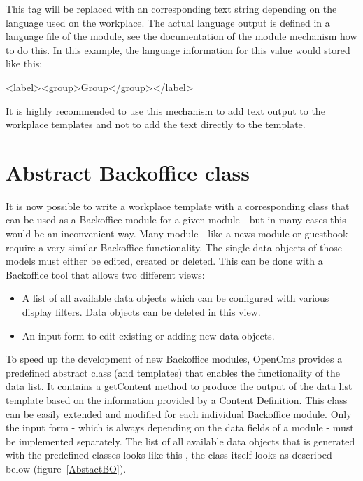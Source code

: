 This tag will be replaced with an corresponding text string depending on
the language used on the workplace. The actual language output is
defined in a language file of the module, see the documentation of the
module mechanism how to do this. In this example, the language
information for this value would stored like this:
\begin{java}
<label><group>Group</group></label>\\
\end{java}
It is highly recommended to use this mechanism to add text output to the
workplace templates and not to add the text directly to the template.

\section {Abstract Backoffice class}
It is now possible to write a workplace template with a corresponding
class that can be used as a Backoffice module for a given module - but
in many cases this would be an inconvenient way. Many module - like a
news module or guestbook -  require a very similar Backoffice
functionality. The single data objects of those models must either be
edited, created or deleted. This can be done with a Backoffice tool
that allows two different views:

\begin{itemize}
\item A list of all available data objects which can be configured
with various display filters. Data objects can be deleted in this view.
       
\item An input form to edit existing or adding new data objects.
\end{itemize}

To speed up the development of new Backoffice modules, OpenCms provides
a predefined abstract class (and templates) that enables the
functionality of the data list.  It contains a {\meth getContent} method to
produce the output of the data list template based on the information
provided by a Content Definition. This class can be easily extended and
modified for each individual Backoffice module. Only the input form -
which is always depending on the data fields of a module - must be
implemented separately. The list of all available data objects that is
generated with the predefined classes looks like this , the class itself
looks as described below (figure~\ref{AbstactBO}).

